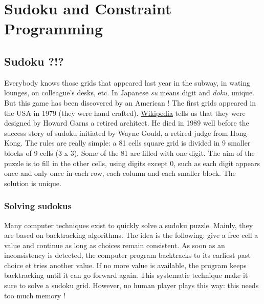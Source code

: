 \label{sudokuandcp}
\hypertarget{sudokuandcp}{}

\chapter{Sudoku and Constraint Programming}\label{sudokuandcp:sudokuandconstraintprogramming}\hypertarget{sudokuandcp:sudokuandconstraintprogramming}{}

\section{Sudoku ?!?}\label{sudokuandcp:sudoku!}\hypertarget{sudokuandcp:sudoku!}{}


Everybody knows those grids that appeared last year in the subway, in wating lounges, on colleague's desks, etc. In Japanese \emph{su} means digit and \emph{doku}, unique. But this game has been discovered by an American ! The first grids appeared in the USA in 1979 (they were hand crafted). \href{http://en.wikipedia.org/wiki/sudoku}{Wikipedia} tells us that they were designed by Howard Garns a retired architect. He died in 1989 well before the success story of sudoku initiated by Wayne Gould, a retired judge from Hong-Kong. The rules are really simple: a 81 cells square grid is divided in 9 smaller blocks of 9 cells (3 x 3). Some of the 81 are filled with one digit. The aim of the puzzle is to fill in the other cells, using digits except 0, such as each digit appears once and only once in each row, each column and each smaller block. The solution is unique.

\subsection{Solving sudokus}\label{sudokuandcp:solvingsudokus}\hypertarget{sudokuandcp:solvingsudokus}{}

Many computer techniques exist to quickly solve a sudoku puzzle. Mainly, they are based on backtracking algorithms. The idea is the following: give a free cell a value and continue as long as choices remain consistent. As soon as an inconsistency is detected, the computer program backtracks to its earliest past choice et tries another value. If no more value is available, the program keeps backtracking until it can go forward again. This systematic technique make it sure to solve a sudoku grid. However, no human player plays this way: this needs too much memory ! 

